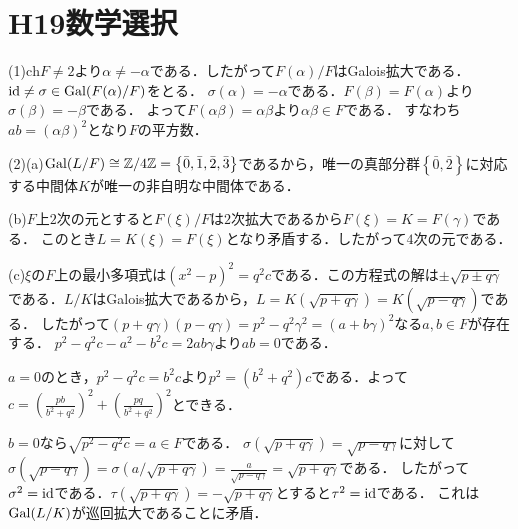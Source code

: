 \documentclass[
		book,
		head_space=20mm,
		foot_space=20mm,
		gutter=10mm,
		line_length=190mm
]{jlreq}
\begin{document}
\section{H19数学選択}
(1)$\mathrm{ch}F\neq 2$より$\alpha\neq -\alpha$である．したがって$F(\alpha)/F$はGalois拡大である．
$\mathop{\mathrm{id}}\neq \sigma\in \mathop{\mathrm{Gal}}(F(\alpha)/F)$をとる．
$\sigma(\alpha)=-\alpha$である．$F(\beta)=F(\alpha)$より$\sigma(\beta)=-\beta$である．
よって$F(\alpha\beta)=\alpha\beta$より$\alpha\beta\in F$である．
すなわち$ab=(\alpha\beta)^2$となり$F$の平方数．

(2)(a)$\mathop{\mathrm{Gal}}(L/F)\cong \mathbb{Z}/4\mathbb{Z}=\left\{ \bar{0},\bar{1},\bar{2},\bar{3} \right\}$であるから，唯一の真部分群$\left\{ \bar{0},\bar{2} \right\}$に対応する中間体$K$が唯一の非自明な中間体である．

(b)$F$上$2$次の元とすると$F(\xi)/F$は$2$次拡大であるから$F(\xi)=K=F(\gamma)$である．
このとき$L=K(\xi)=F(\xi)$となり矛盾する．したがって$4$次の元である．

(c)$\xi$の$F$上の最小多項式は$(x^2-p)^2=q^2c$である．この方程式の解は$\pm\sqrt{p\pm q\gamma}$である．$L/K$はGalois拡大であるから，$L=K(\sqrt{p+q\gamma})=K(\sqrt{p-q\gamma})$である．
したがって$(p+q\gamma)(p-q\gamma)=p^2-q^2\gamma^2=(a+b\gamma)^2 $なる$a,b\in F$が存在する．
$p^2-q^2c-a^2-b^2c=2ab\gamma$より$ab=0$である．

$a=0$のとき，$p^2-q^2c=b^2c$より$p^2=(b^2+q^2)c$である．よって$c=(\frac{pb}{b^2+q^2})^2+(\frac{pq}{b^2+q^2})^2$とできる．

$b=0$なら$\sqrt{p^2-q^2c}=a\in F$である．
$\sigma(\sqrt{p+q\gamma})=\sqrt{p-q\gamma}$に対して$\sigma(\sqrt{p-q\gamma})=\sigma(a/\sqrt{p+q\gamma})=\frac{a}{\sqrt{p-q\gamma}}=\sqrt{p+q\gamma}$である．
したがって$\sigma^2=\mathop{\mathrm{id}}$である．$\tau(\sqrt{p+q\gamma})=-\sqrt{p+q\gamma}$とすると$\tau^2=\mathop{\mathrm{id}}$である．
これは$\mathop{\mathrm{Gal}}(L/K)$が巡回拡大であることに矛盾．
\end{document}
